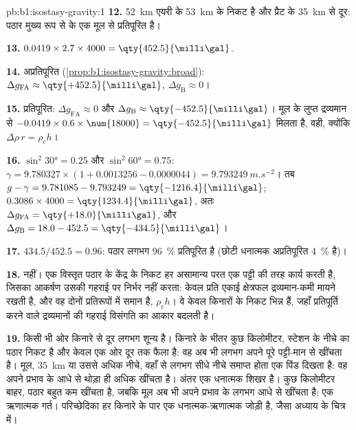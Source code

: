 \begin{solution}{pb:b1:isostasy-gravity:1}
\textbf{12.} \qty{52}{km} एयरी के \qty{53}{km} के निकट है और प्रैट के \qty{35}{km} से दूर: पठार मुख्य रूप से  के एक मूल से प्रतिपूरित है।

\textbf{13.} $0.0419\times2.7\times4000 = \qty{452.5}{\milli\gal}$.

\textbf{14.} अप्रतिपूरित (\cref{prop:b1:isostasy-gravity:broad}):
$\Delta g_{\mathrm{FA}} \approx \qty{+452.5}{\milli\gal}$,
$\Delta g_{\mathrm B} \approx 0$।

\textbf{15.} प्रतिपूरित: $\Delta g_{\mathrm{FA}} \approx 0$ और
$\Delta g_{\mathrm B} \approx \qty{-452.5}{\milli\gal}$। मूल के लुप्त द्रव्यमान से
$-0.0419\times0.6\times\num{18000} = \qty{-452.5}{\milli\gal}$ मिलता है, वही, क्योंकि $\Delta\rho\,r = \rho_c h$।

\textbf{16.} $\sin^2\ang{30} = 0.25$ और $\sin^2\ang{60} = 0.75$:
$\gamma = 9.780327\times(1 + 0.0013256 - 0.0000044) = \qty{9.793249}{m.s^{-2}}$।
तब $g - \gamma = 9.781085 - 9.793249 = \qty{-1216.4}{\milli\gal}$; 
$0.3086\times4000 = \qty{1234.4}{\milli\gal}$, अतः
$\Delta g_{\mathrm{FA}} = \qty{+18.0}{\milli\gal}$, और
$\Delta g_{\mathrm B} = 18.0 - 452.5 = \qty{-434.5}{\milli\gal}$।

\textbf{17.} $434.5/452.5 = 0.96$: पठार लगभग \qty{96}{\percent} प्रतिपूरित है (छोटी धनात्मक  अप्रतिपूरित \qty{4}{\percent} है)।

\textbf{18.} नहीं। एक विस्तृत पठार के केंद्र के निकट हर असामान्य परत एक पट्टी की तरह कार्य करती है, जिसका आकर्षण उसकी गहराई पर निर्भर नहीं करता: केवल प्रति एकाई क्षेत्रफल द्रव्यमान-कमी मायने रखती है, और वह दोनों प्रतिरूपों में समान है, $\rho_c h$। वे केवल किनारों के निकट भिन्न हैं, जहाँ प्रतिपूर्ति करने वाले द्रव्यमानों की गहराई विसंगति का आकार बदलती है।

\textbf{19.} किसी भी ओर किनारे से दूर  लगभग शून्य है। किनारे के भीतर कुछ किलोमीटर, स्टेशन के नीचे का पठार निकट है और केवल एक ओर दूर तक फैला है: वह अब भी लगभग अपने पूरे पट्टी-मान से खींचता है। मूल, \qty{35}{km} या उससे अधिक नीचे, वहाँ से लगभग सीधे नीचे समाप्त होता एक पिंड दिखता है: वह अपने प्रभाव के आधे से थोड़ा ही अधिक खींचता है। अंतर एक धनात्मक शिखर है। कुछ किलोमीटर बाहर, पठार बहुत कम खींचता है, जबकि मूल अब भी अपने प्रभाव के लगभग आधे से खींचता है: एक ऋणात्मक गर्त। परिच्छेदिका हर किनारे के पार एक धनात्मक-ऋणात्मक जोड़ी है, जैसा अध्याय के चित्र में।


\end{solution}
